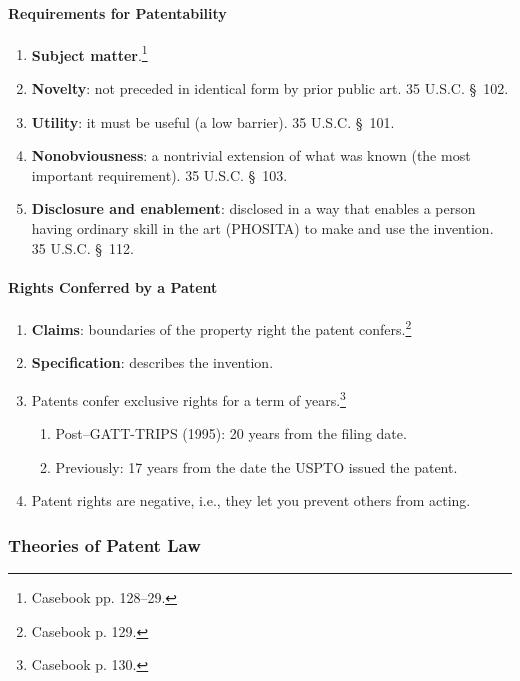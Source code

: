 \paragraph{Requirements for Patentability}

\begin{enumerate}
    \item \textbf{Subject matter}.\footnote{Casebook pp. 128--29.}
    \item \textbf{Novelty}: not preceded in identical form by prior public art. 
    35 U.S.C. \S\ 102.
    \item \textbf{Utility}: it must be useful (a low barrier). 35 U.S.C. \S\ 
    101.
    \item \textbf{Nonobviousness}: a nontrivial extension of what was known (the 
    most important requirement). 35 U.S.C. \S\ 103.
    \item \textbf{Disclosure and enablement}: disclosed in a way that enables a 
    person having ordinary skill in the art (PHOSITA) to make and use the 
    invention. 35 U.S.C. \S\ 112.
\end{enumerate}

\paragraph{Rights Conferred by a Patent}

\begin{enumerate}
    \item \textbf{Claims}: boundaries of the property right the patent 
    confers.\footnote{Casebook p. 129.}
    \item \textbf{Specification}: describes the invention.
    \item Patents confer exclusive rights for a term of years.\footnote{Casebook 
    p. 130.}
    \begin{enumerate}
        \item Post--GATT-TRIPS (1995): 20 years from the filing date.
        \item Previously: 17 years from the date the USPTO issued the patent.
    \end{enumerate}
    \item Patent rights are negative, i.e., they let you prevent others from 
    acting.
\end{enumerate}

\subsubsection{Theories of Patent Law}

